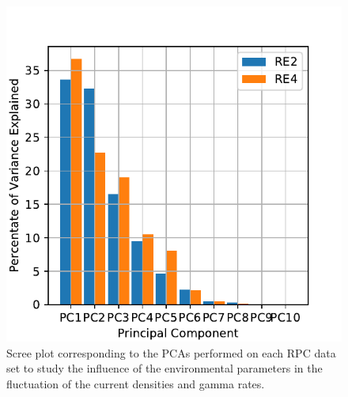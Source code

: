 	\begin{figure}
    	\centering
		\includegraphics[width = \linewidth]{fig/chapt5/Scree_plot_Irr-Ref-Ratio.pdf}
        \caption{\label{fig:GIFpp-Scree_Ratios} Scree plot corresponding to the PCAs performed on each RPC data set to study the influence of the environmental parameters in the fluctuation of the current densities and gamma rates.}
	\end{figure}
	
